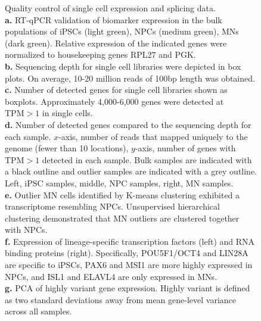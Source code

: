 \clearpage
\thispagestyle{facingcaption}
\begin{figure}[h]
\captionsetup{labelformat=prev-page}
\caption[Quality control of single cell expression and splicing data.]{Quality control of single cell expression and splicing data.\\
\textbf{a.} RT-qPCR validation of biomarker expression in the bulk populations of iPSCs (light green), NPCs  (medium green), MNs (dark green). Relative expression of the indicated genes were normalized to housekeeping genes RPL27 and PGK. \\
\textbf{b.} Sequencing depth for single cell libraries were depicted in box plots. On average, 10-20 million reads of 100bp length was obtained. \\
\textbf{c.} Number of detected genes for single cell libraries shown as boxplots. Approximately 4,000-6,000 genes were detected at $\mathrm{TPM} > 1$ in single cells. \\
\textbf{d.} Number of detected genes compared to the sequencing depth for each sample. $x$-axis, number of reads that mapped uniquely to the genome (fewer than 10 locations), $y$-axis, number of genes with $\mathrm{TPM} > 1$ detected in each sample. Bulk samples are indicated with a black outline and outlier samples are indicated with a grey outline. Left, iPSC samples, middle, NPC samples, right, MN samples.\\
\textbf{e.} Outlier MN cells identified by K-means clustering exhibited a transcriptome resembling NPCs. Unsupervised hierarchical clustering demonstrated that MN outliers are clustered together with NPCs.\\
\textbf{f.} Expression of lineage-specific transcription factors (left) and RNA binding proteins (right). Specifically, POU5F1/OCT4 and LIN28A are specific to iPSCs, PAX6 and MSI1 are more highly expressed in NPCs, and ISL1 and ELAVL4 are only expressed in MNs. \\
\textbf{g.} PCA of highly variant gene expression. Highly variant is defined as two standard deviations away from mean gene-level variance across all samples.\\
}
\end{figure}

